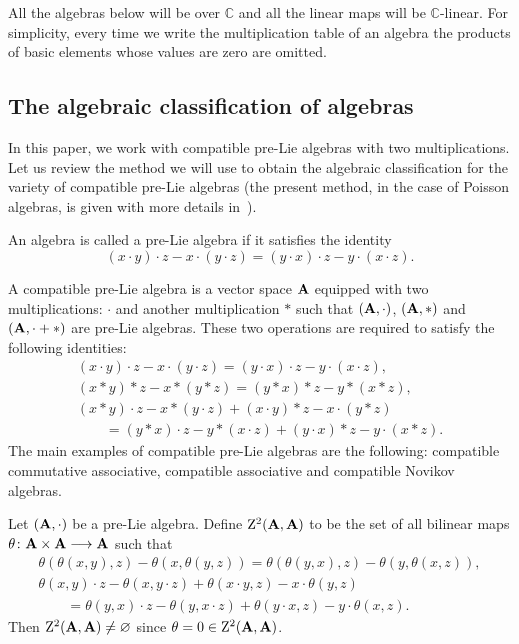 \documentclass[pdftex]{sigma}
\numberwithin{equation}{section}
\begin{document}
All the algebras below will be over $\mathbb C$ and all the linear maps will be $\mathbb C$-linear.
For simplicity, every time we write the multiplication table of an algebra
the products of basic elements whose values are zero are omitted.

\subsection{The algebraic classification of algebras}
In this paper, we work with compatible pre-Lie algebras with two multiplications. Let us review the method we will use to obtain the algebraic classification for the variety of compatible pre-Lie algebras
(the present method, in the case of Poisson algebras, is given with more details in~\cite{fkkv,afm}).


\begin{Definition}
An algebra is called a pre-Lie algebra if it satisfies the identity
\[
( x\cdot y) \cdot z-x\cdot ( y\cdot
z)=( y\cdot x) \cdot z -y\cdot ( x\cdot z).
\]
\end{Definition}

\begin{Definition}
A compatible pre-Lie algebra is a vector space ${\bf A}$ equipped with
two multiplications: $\cdot$ and another multiplication $\ast$
such that $({\bf A}, \cdot)$, $({\bf A}, \ast)$ and
$({\bf A}, \cdot+ \ast)$ are pre-Lie algebras.
These two operations are required to satisfy the following identities:
\begin{gather*}
( x\cdot y) \cdot z-x\cdot ( y\cdot
z)=( y\cdot x) \cdot z -y\cdot ( x\cdot z),\\
( x\ast y) \ast z-x\ast ( y\ast
z)=( y\ast x) \ast z -y\ast ( x\ast z),\\
(x\ast y)\cdot z-x\ast (y\cdot z)+(x\cdot y)\ast z-x\cdot (y\ast z)\\
\qquad =
(y\ast x)\cdot z-y\ast (x\cdot z)+(y\cdot x)\ast z-y\cdot (x\ast z).
 \end{gather*}
The main examples of compatible pre-Lie algebras are the following:
compatible commutative associative,
compatible associative
and compatible Novikov algebras.
\end{Definition}


\begin{Definition}
Let $( {\bf A},\cdot ) $ be a pre-Lie
algebra. Define ${\rm Z}^{2}( {\bf A},{\bf A}) $ to be the
set of all bilinear maps
$\theta \colon{\bf A}\times {\bf A}\longrightarrow {\bf A}$ such that
\begin{gather*}
\theta(\theta( x, y), z)-\theta(x, \theta ( y, z))=\theta(\theta( y, x) , z) - \theta(y, \theta ( x, z)),\\
\theta(x, y)\cdot z-\theta(x, y\cdot z)
+\theta(x\cdot y, z) -x\cdot \theta(y, z)\\
\qquad =
\theta(y, x)\cdot z-\theta(y, x\cdot z)+
\theta(y\cdot x, z)-y\cdot \theta(x, z) .
 \end{gather*}
Then ${\rm Z}^{2}({\bf A},{\bf A})\neq {\varnothing }$ since $\theta=0\in {\rm Z}^{2}({\bf A},{\bf A})$.
\end{Definition}
\end{document}
